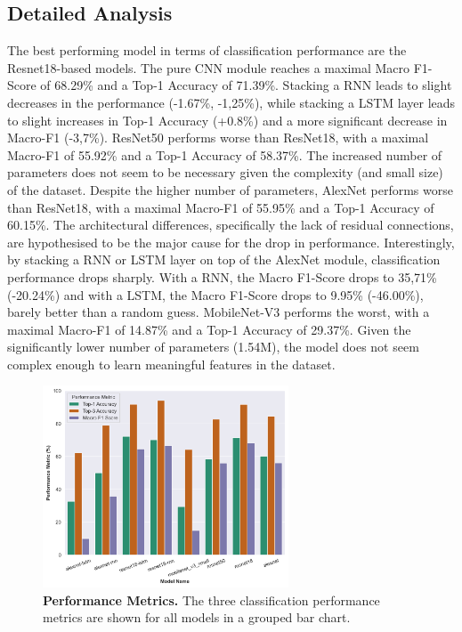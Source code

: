 \documentclass[a4paper]{article}
\begin{document}
  \subsection{Detailed Analysis} %
  \label{sub:Detailed Analysis}

  The best performing model in terms of classification performance are the
  Resnet18-based models. The pure CNN module reaches a maximal Macro F1-Score 
  of 68.29\% and a Top-1 Accuracy of 71.39\%. Stacking a RNN leads to slight
  decreases in the performance (-1.67\%, -1,25\%), while stacking a LSTM layer
  leads to slight increases in Top-1 Accuracy (+0.8\%) and a more significant
  decrease in Macro-F1 (-3,7\%). ResNet50 performs worse than ResNet18, with a
  maximal Macro-F1 of 55.92\% and a Top-1 Accuracy of 58.37\%. The increased
  number of parameters does not seem to be necessary given the complexity (and
  small size) of the dataset.
  Despite the higher number of parameters, AlexNet performs worse than ResNet18,
  with a maximal Macro-F1 of 55.95\% and a Top-1 Accuracy of 60.15\%. The
  architectural differences, specifically the lack of residual connections, are
  hypothesised to be the major cause for the drop in performance. Interestingly,
  by stacking a RNN or LSTM layer on top of the AlexNet module, classification
  performance drops sharply. With a RNN, the Macro F1-Score drops to 35,71\%
  (-20.24\%) and with a LSTM, the Macro F1-Score drops to 9.95\% (-46.00\%),
  barely better than a random guess.
  MobileNet-V3 performs the worst, with a maximal Macro-F1 of 14.87\% and a
  Top-1 Accuracy of 29.37\%. Given the significantly lower number of parameters 
  (1.54M), the model does not seem complex enough to learn meaningful features
  in the dataset.

  \begin{figure}[ht]
    \begin{center}
      \includegraphics[width=0.65\textwidth]
      {./figures/experiment1-performance-metricz.png}
    \end{center}

    \caption{
    \textbf{Performance Metrics.} The three classification performance metrics
    are shown for all models in a grouped bar chart.
    }

    \label{fig:performance-metrics}
  \end{figure}
\end{document}
